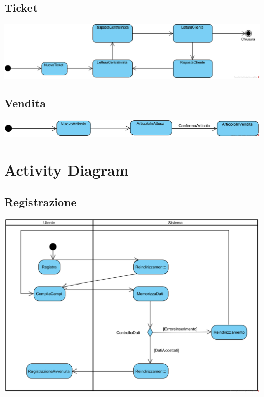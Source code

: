 \documentclass[12pt,a4paper]{article}
\begin{document}
\subsection{Ticket}
\includegraphics[width=\textwidth]{StateChart/Ticket}

\subsection{Vendita}
\includegraphics[width=\textwidth]{StateChart/Vendita}

\newpage

\section{Activity Diagram}

\subsection{Registrazione}
\begin{center}
\includegraphics[width=\textwidth]{ActivityDiagram/Registrazione}
\end{center}
\end{document}
